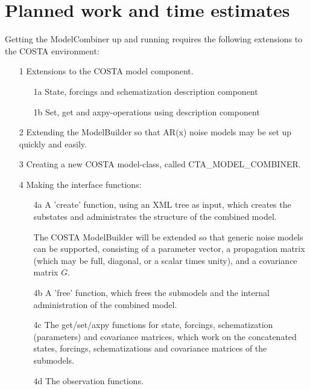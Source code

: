 \documentclass[a4paper,12pt]{article}
\begin{document}
\section{Planned work and time estimates}
Getting the ModelCombiner up and running requires the following
extensions to the COSTA environment:
\begin{itemize}
\item[1] Extensions to the COSTA model component.
      \begin{itemize}
         \item[1a] State, forcings and schematization description component
         \item[1b] Set, get and axpy-operations using description component
      \end{itemize}

\item[2] Extending the ModelBuilder so that AR(x) noise models may be set
         up quickly and easily.

\item[3] Creating a new COSTA model-class, called CTA\_MODEL\_COMBINER.

\item[4] Making the interface functions:
     \begin{itemize}
       \item[4a] A 'create' function, using an XML tree as input, which 
             creates the substates and administrates the structure of the 
             combined model.

             The COSTA ModelBuilder will be extended so that generic noise 
             models can be supported, consisting of a parameter vector, a 
             propagation matrix (which may be full, diagonal, or a scalar
             times unity), and a covariance matrix $G$.

       \item[4b] A 'free' function, which frees the submodels and the internal
             administration of the combined model.

       \item[4c] The get/set/axpy functions for state, forcings, 
             schematization (parameters) and covariance matrices, 
             which work on the 
             concatenated states, forcings, schematizations and covariance
             matrices of the submodels. 

       \item[4d] The observation functions.


\end{itemize}
\end{itemize}
\end{document}
